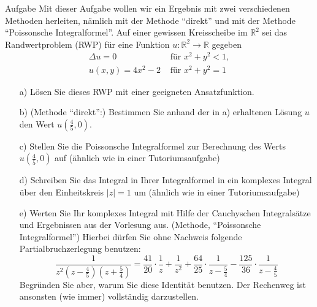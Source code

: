 \documentclass{scrartcl}
\begin{document}
\begin{section}{Aufgabe}
Mit dieser Aufgabe wollen wir ein Ergebnis mit zwei verschiedenen Methoden herleiten,
nämlich mit der Methode \enquote{direkt} und mit der Methode \enquote{Poissonsche Integralformel}.
Auf einer gewissen Kreisscheibe im \( \mathbb{R}^{2} \) sei das Randwertproblem (RWP) für eine Funktion \( u: \mathbb{R}^{2} \rightarrow \mathbb{R} \) gegeben 
\[ \begin{array}{ll} \Delta u=0 & \text { für } x^{2}+y^{2}<1, \\ u(x, y)=4 x^{2}-2 & \text { für } x^{2}+y^{2}=1 \end{array} \] 
\begin{itemize}
\item[a)]Lösen Sie dieses RWP mit einer geeigneten Ansatzfunktion. 
\item[b)] (Methode \enquote{direkt}:) Bestimmen Sie anhand der in a) erhaltenen Lösung \( u \) den Wert \( u\left(\frac{4}{5}, 0\right) \). 
\item[c)] Stellen Sie die Poissonsche Integralformel zur Berechnung des Werts \( u\left(\frac{4}{5}, 0\right) \) auf (ähnlich wie in einer Tutoriumsaufgabe) 
\item[d)] Schreiben Sie das Integral in Ihrer Integralformel in ein komplexes Integral über den Einheitskreis \( |z|=1 \) um (ähnlich wie in einer Tutoriumsaufgabe) 
\item[e)]  Werten Sie Ihr komplexes Integral mit Hilfe der Cauchyschen Integralsätze und Ergebnissen aus der Vorlesung aus. (Methode, \enquote{Poissonsche Integralformel}) Hierbei dürfen Sie ohne Nachweis folgende Partialbruchzerlegung benutzen: \[ \frac{1}{z^{2}\left(z-\frac{4}{5}\right)\left(z+\frac{5}{4}\right)}=\frac{41}{20} \cdot \frac{1}{z}+\frac{1}{z^{2}}+\frac{64}{25} \cdot 
\frac{1}{z-\frac{5}{4}}-\frac{125}{36} \cdot \frac{1}{z-\frac{4}{5}}\]
Begründen Sie aber, warum Sie diese Identität benutzen. Der Rechenweg ist ansonsten (wie immer) vollständig darzustellen.
\end{itemize}



\end{section}
\end{document}
